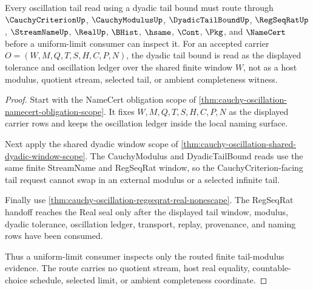 \begin{theorem}
\label{thm:cauchyoscillation-tail-modulus-route}
Every oscillation tail read using a dyadic tail bound must route through $\CauchyCriterionUp$, $\CauchyModulusUp$, $\DyadicTailBoundUp$, $\RegSeqRatUp$, $\StreamNameUp$, $\RealUp$, $\BHist$, $\hsame$, $\Cont$, $\Pkg$, and $\NameCert$ before a uniform-limit consumer can inspect it. For an accepted carrier $O=(W,M,Q,T,S,H,C,P,N)$, the dyadic tail bound is read as the displayed tolerance and oscillation ledger over the shared finite window $W$, not as a host modulus, quotient stream, selected tail, or ambient completeness witness.
\end{theorem}
\begin{proof}
Start with the NameCert obligation scope of \autoref{thm:cauchy-oscillation-namecert-obligation-scope}. It fixes $W,M,Q,T,S,H,C,P,N$ as the displayed carrier rows and keeps the oscillation ledger inside the local naming surface.

Next apply the shared dyadic window scope of \autoref{thm:cauchy-oscillation-shared-dyadic-window-scope}. The CauchyModulus and DyadicTailBound reads use the same finite StreamName and RegSeqRat window, so the CauchyCriterion-facing tail request cannot swap in an external modulus or a selected infinite tail.

Finally use \autoref{thm:cauchy-oscillation-regseqrat-real-nonescape}. The RegSeqRat handoff reaches the Real seal only after the displayed tail window, modulus, dyadic tolerance, oscillation ledger, transport, replay, provenance, and naming rows have been consumed.

Thus a uniform-limit consumer inspects only the routed finite tail-modulus evidence. The route carries no quotient stream, host real equality, countable-choice schedule, selected limit, or ambient completeness coordinate.
\end{proof}


